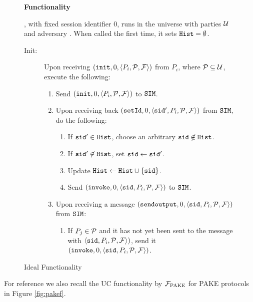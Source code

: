 \begin{figure}[h!]
\begin{mdframed}[innertopmargin=10pt]
\begin{center}
{\bf Functionality \Finit}
\end{center}
\Finit, with fixed session identifier $0$, runs in the universe with parties $\mathcal{U}$ and adversary \SIM.
When called the first time, it sets $\mathtt{Hist}=\emptyset$.

\begin{description}
	
	\item[Init:] Upon receiving $(\mathtt{init}, 0, \langle P_i, \mathcal{P}, \mathcal{F} \rangle)$ from $P_i$, where $\mathcal{P}\subseteq\mathcal{U}$, execute the following:
	  \begin{enumerate}
	    \item Send $(\mathtt{init}, 0, \langle P_i, \mathcal{P}, \mathcal{F} \rangle)$ to $\mathtt{SIM}$.
	    \item Upon receiving back $(\mathtt{setId}, 0, \langle \mathtt{sid}', P_i, \mathcal{P}, \mathcal{F} \rangle)$ from $\mathtt{SIM}$, do the following:
	      \begin{enumerate}
	        \item If $\mathtt{sid}'\in \mathtt{Hist}$, choose an arbitrary $\mathtt{sid}\not\in \mathtt{Hist}$.
	        \item If $\mathtt{sid}'\not\in \mathtt{Hist}$, set $\mathtt{sid}\gets\mathtt{sid}'$.
	        \item Update $\mathtt{Hist} \gets \mathtt{Hist} \cup \{\mathtt{sid}\}$.
	        \item Send $(\mathtt{invoke}, 0, \langle \mathtt{sid}, P_i, \mathcal{P}, \mathcal{F} \rangle)$ to $\mathtt{SIM}$.
	      \end{enumerate}
	    \item Upon receiving a message $(\mathtt{sendoutput}, 0, \langle \mathtt{sid}, P_i, \mathcal{P}, \mathcal{F} \rangle)$ from $\mathtt{SIM}$:
	      \begin{enumerate}
	        \item If $P_j\in\mathcal{P}$ and it has not yet been sent to the \invoke message with $\langle \mathtt{sid}, P_i, \mathcal{P}, \mathcal{F} \rangle)$, send it $(\mathtt{invoke}, 0, \langle \mathtt{sid}, P_i, \mathcal{P}, \mathcal{F} \rangle)$.
	      \end{enumerate}
	  \end{enumerate}
	
\end{description}
\end{mdframed}
\caption{Ideal Functionality \Finit}
\label{fig:initfunctionality}
\end{figure}

\noindent
For reference we also recall the \ac{UC} functionality by \citet{Canetti2005} $\mathcal{F}_{\mathrm{PAKE}}$ for \ac{PAKE} protocols in Figure \ref{fig:pakef}.

